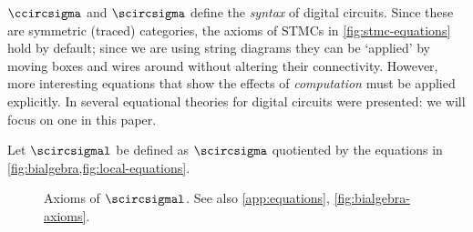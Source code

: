 \(\ccircsigma\) and \(\scircsigma\) define the \emph{syntax} of digital
circuits.
Since these are symmetric (traced) categories, the axioms of STMCs in
\cref{fig:stmc-equations} hold by default; since we are using string diagrams
they can be `applied' by moving boxes and wires around without altering their
connectivity.
However, more interesting equations that show the effects of \emph{computation}
must be applied explicitly.
In \cite{ghica2022compositional} several equational theories for digital
circuits were presented: we will focus on one in this paper.

\begin{definition}
    Let \(\scircsigmal\) be defined as \(\scircsigma\) quotiented by the
    equations in \cref{fig:bialgebra,fig:local-equations}.
\end{definition}

\begin{figure*}
    \centering
    \combinationalequationslist
    \begin{minipage}[b]{0.215\textwidth}
        \forkgateeqn
    \end{minipage}
    \hspace{-0.6em}
    \begin{minipage}[b]{0.174\textwidth}
        \stubgateeqn
    \end{minipage}
    \hspace{-0.6em}
    \begin{minipage}[b]{0.171\textwidth}
        \stubdelayeqn
    \end{minipage}
    \hspace{-0.6em}
    \begin{minipage}[b]{0.164\textwidth}
        \forkjoininverseeqn
    \end{minipage}
    \hspace{-0.6em}
    \begin{minipage}[b]{0.2714\textwidth}
        \streamingeqn
    \end{minipage}
    \begin{minipage}[b]{0.16\textwidth}
        \disconnecteqn
    \end{minipage}
    \begin{minipage}[b]{0.2\textwidth}
        \forkdelayeqn
    \end{minipage}
    \begin{minipage}[b]{0.2\textwidth}
        \joindelayeqn
    \end{minipage}
    \begin{minipage}[b]{0.19\textwidth}
        \instantfeedbackeqn
    \end{minipage}
    \begin{minipage}[b]{0.21\textwidth}
        \delaydiscardeqn
    \end{minipage}
    \caption{
        Axioms of \(\scircsigmal\).
        See also \cref{app:equations}, \cref{fig:bialgebra-axioms}.
    }
    \label{fig:local-equations}
\end{figure*}